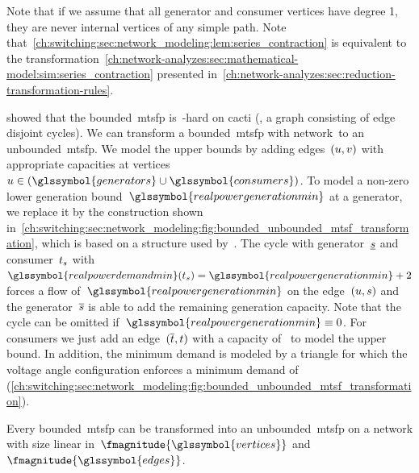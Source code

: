 %
Note that if we assume that all generator and consumer vertices have degree 1,
they are never internal vertices of any simple path. Note
that~\cref{ch:switching:sec:network_modeling:lem:series_contraction} is
equivalent to the
transformation~\cref{ch:network-analyzes:sec:mathematical-model:sim:series_contraction}
presented in~\cref{ch:network-analyzes:sec:reduction-transformation-rules}.

\textcite{Leh14,Leh15a} showed that the bounded~\gls{mtsfp} is~\NP-hard on
cacti (\ie, a graph consisting of edge disjoint cycles). We can transform a
bounded~\gls{mtsfp} with network~\dcnetworktuple to an
unbounded~\gls{mtsfp}. We model the upper bounds by adding
edges~$(u,v)$ with appropriate capacities at
vertices~$\vertexa\in(\glssymbol{generators}\cup\glssymbol{consumers})$. To
model a
% 
non-zero lower generation bound~$\glssymbol{realpowergenerationmin}$ at a
generator, we replace it by the construction shown
in~\cref{ch:switching:sec:network_modeling:fig:bounded_unbounded_mtsf_transformation},
which is based on a structure used by~\textcite{Leh14}. The cycle with
generator~$\underline{s}$ and consumer~$t_{s}$
with~$\glssymbol{realpowerdemandmin}(\sink_\source) =
\glssymbol{realpowergenerationmin} + 2$ forces a flow
of~$\glssymbol{realpowergenerationmin}$ on the edge~$(u,s)$ and the
generator~$\overline{s}$ is able to add the remaining generation capacity.
Note that the cycle can be omitted if~$\glssymbol{realpowergenerationmin} \equiv
0$. For consumers we just add an edge~$(\overline{t},t)$ with a capacity
of~ to model the upper bound. In addition, the
minimum demand is modeled by a triangle for which the voltage angle
configuration enforces a minimum demand of~
(\cref{ch:switching:sec:network_modeling:fig:bounded_unbounded_mtsf_transformation}).
%
\begin{lemma}%
  Every bounded~\gls{mtsfp} can be transformed into an
  unbounded~\gls{mtsfp} on a network with size linear
  in~$\fmagnitude{\glssymbol{vertices}}$ and~$\fmagnitude{\glssymbol{edges}}$.
  \label{lem:bounded_unbounded_mtsf_transformation}%
\end{lemma}%
